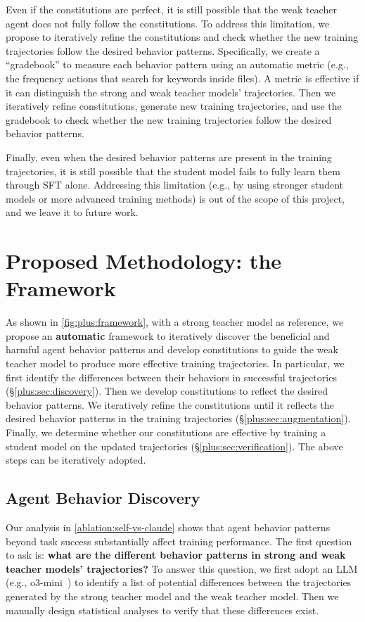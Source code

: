 Even if the constitutions are perfect, it is still possible that the weak teacher agent does not fully follow the constitutions. 
To address this limitation, we propose to iteratively refine the constitutions and check whether the new training trajectories follow the desired behavior patterns.
Specifically, we create a ``gradebook'' to measure each behavior pattern using an automatic metric (e.g., the frequency actions that search for keywords inside files). A metric is effective if it can distinguish the strong and weak teacher models' trajectories.
Then we iteratively refine constitutions, generate new training trajectories, and use the gradebook to check whether the new training trajectories follow the desired behavior patterns.


Finally, even when the desired behavior patterns are present in the training trajectories, it is still possible that the student model fails to fully learn them through SFT alone.
Addressing this limitation (e.g., by using stronger student models or more advanced training methods) is out of the scope of this project, and we leave it to future work.



\section{Proposed Methodology: the \plusname Framework}
As shown in \autoref{fig:plus:framework}, with a strong teacher model as reference, we propose an \textbf{automatic} framework to iteratively discover the beneficial and harmful agent behavior patterns and develop constitutions to guide the weak teacher model to produce more effective training trajectories.
In particular, we first identify the differences between their behaviors in successful trajectories (\S\ref{plus:sec:discovery}).
Then we develop constitutions to reflect the desired behavior patterns. We iteratively refine the constitutions until it reflects the desired behavior patterns in the training trajectories (\S\ref{plus:sec:augmentation}).
Finally, we determine whether our constitutions are effective by training a student model on the updated trajectories (\S\ref{plus:sec:verification}).
The above steps can be iteratively adopted.





\subsection{Agent Behavior Discovery}
Our analysis in \autoref{ablation:self-vs-claude} shows that agent behavior patterns beyond task success substantially affect training performance. 
The first question to ask is: \textbf{what are the different behavior patterns in strong and weak teacher models' trajectories?}
To answer this question, we first adopt an LLM (e.g., o3-mini~\cite{o3_mini}) to identify a list of potential differences between the trajectories generated by the strong teacher model and the weak teacher model.
Then we manually design statistical analyses to verify that these differences exist.

